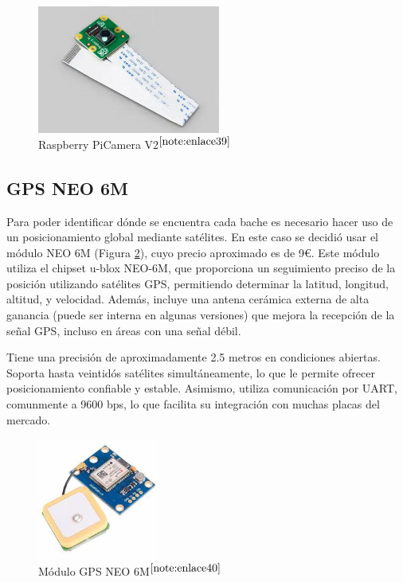 \begin{figure} [h!]
	\begin{center}
		\includegraphics[width=6cm]{figs/campi.png}
	\end{center}
	\caption{Raspberry PiCamera V2$^{\ref{note:enlace39}}$} 
\label{fig:raspberrycam}
\end{figure}

\setcounter{footnote}{39} %

\subsection{GPS NEO 6M}

Para poder identificar dónde se encuentra cada bache es necesario hacer uso de un posicionamiento global mediante satélites. En este caso se decidió usar el módulo NEO 6M (Figura \ref{fig:gps}), cuyo precio aproximado es de 9€. Este módulo utiliza el chipset u-blox NEO-6M, que proporciona un seguimiento preciso de la posición utilizando satélites \acs{GPS}, permitiendo determinar la latitud, longitud, altitud, y velocidad. Además, incluye una antena cerámica externa de alta ganancia (puede ser interna en algunas versiones) que mejora la recepción de la señal \acs{GPS}, incluso en áreas con una señal débil.

Tiene una precisión de aproximadamente 2.5 metros en condiciones abiertas. Soporta hasta veintidós satélites simultáneamente, lo que le permite ofrecer posicionamiento confiable y estable. Asimismo, utiliza comunicación por \ac{UART}, comunmente a 9600 bps, lo que facilita su integración con muchas placas del mercado.

\begin{figure} [h!]
	\begin{center}
		\includegraphics[width=4cm]{figs/GPSNEO6MV2.jpeg}
	\end{center}
	\caption{Módulo GPS NEO 6M$^{\ref{note:enlace40}}$} 
\label{fig:gps}
\end{figure}

